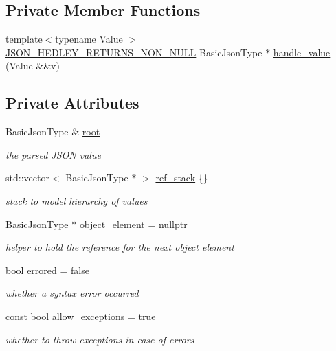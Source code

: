 \subsection*{Private Member Functions}
\begin{DoxyCompactItemize}
\item 
{\footnotesize template$<$typename Value $>$ }\\\hyperlink{json_8hpp_a5f2aaec3b681d0a72f7d6e90b70cdcd1}{J\+S\+O\+N\+\_\+\+H\+E\+D\+L\+E\+Y\+\_\+\+R\+E\+T\+U\+R\+N\+S\+\_\+\+N\+O\+N\+\_\+\+N\+U\+LL} Basic\+Json\+Type $\ast$ \hyperlink{classnlohmann_1_1detail_1_1json__sax__dom__parser_aa1a5e21be350727cf61a101aa5c6796e}{handle\+\_\+value} (Value \&\&v)
\end{DoxyCompactItemize}
\subsection*{Private Attributes}
\begin{DoxyCompactItemize}
\item 
Basic\+Json\+Type \& \hyperlink{classnlohmann_1_1detail_1_1json__sax__dom__parser_aef0477277389e399d7128898841b71c0}{root}
\begin{DoxyCompactList}\small\item\em the parsed J\+S\+ON value \end{DoxyCompactList}\item 
std\+::vector$<$ Basic\+Json\+Type $\ast$ $>$ \hyperlink{classnlohmann_1_1detail_1_1json__sax__dom__parser_aa7526e7ae7be7f63803a23fd8cf36e5d}{ref\+\_\+stack} \{\}
\begin{DoxyCompactList}\small\item\em stack to model hierarchy of values \end{DoxyCompactList}\item 
Basic\+Json\+Type $\ast$ \hyperlink{classnlohmann_1_1detail_1_1json__sax__dom__parser_a9c03c76d3a8e89c8928097ba0b92c2db}{object\+\_\+element} = nullptr
\begin{DoxyCompactList}\small\item\em helper to hold the reference for the next object element \end{DoxyCompactList}\item 
bool \hyperlink{classnlohmann_1_1detail_1_1json__sax__dom__parser_a31ccb472ed855e2f2370fd091d91aad7}{errored} = false
\begin{DoxyCompactList}\small\item\em whether a syntax error occurred \end{DoxyCompactList}\item 
const bool \hyperlink{classnlohmann_1_1detail_1_1json__sax__dom__parser_ad0953e8d888339421d909d9016bc6e2c}{allow\+\_\+exceptions} = true
\begin{DoxyCompactList}\small\item\em whether to throw exceptions in case of errors \end{DoxyCompactList}\end{DoxyCompactItemize}


